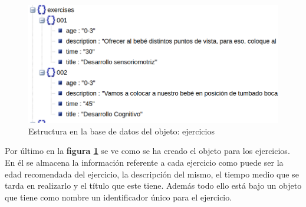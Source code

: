 \medskip
\begin{figure}
    \includegraphics[width=\linewidth]{./images/database/exercises-database.png}
    \caption{Estructura en la base de datos del objeto: ejercicios}
    \label{ejercicios}
\end{figure}

Por último en la \textbf{figura \ref{ejercicios}} se ve
como se ha creado el objeto para los ejercicios. En él se almacena la información
referente a cada ejercicio como puede ser la edad recomendada del ejercicio,
la descripción del mismo, el tiempo medio que se tarda en realizarlo y el
título que este tiene. Además todo ello está bajo un objeto que tiene como
nombre un identificador único para el ejercicio.

